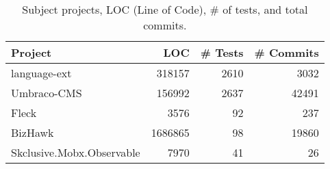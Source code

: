 \begin{table}
\caption{Subject projects, LOC (Line of Code), \# of tests, and total commits. }
\begin{center}
{\scriptsize
\begin{tabular}{|l|r|r|r|}
\hline
Project & LOC & \# Tests & \# Commits \\
\hline
\hline
{language-ext} & 318157 & 2610 & 3032\\
\hline
{Umbraco-CMS} & 156992 & 2637 & 42491\\
\hline
{Fleck} & 3576 & 92 & 237\\
\hline
{BizHawk} & 1686865 & 98 & 19860\\
\hline
{Skclusive.Mobx.Observable} & 7970 & 41 & 26\\
\hline

\end{tabular}
}
\end{center}
\label{tab:avgimproved1}
\end{table}

